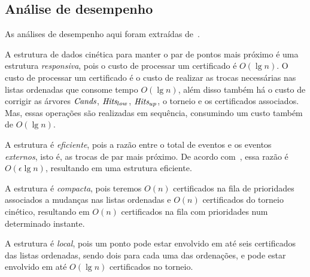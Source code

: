 







\FloatBarrier

\subsection{Análise de desempenho}\label{subsec:par:analise-de-desempenho}

As análises de desempenho aqui foram extraídas de~\cite{eduardo}.

A estrutura de dados cinética para manter o par de pontos mais próximo é uma estrutura
\textit{responsiva}, pois o custo de processar um certificado é $O(\lg{n})$.
O custo de processar um certificado é o custo de realizar as trocas necessárias nas listas
ordenadas que consome tempo $O(\lg{n})$, além disso também há o custo de corrigir as árvores
$\textit{Cands}$, $\textit{Hits}_{low}$, $\textit{Hits}_{up}$, o torneio e os certificados associados.
Mas, essas operações são realizadas em sequência, consumindo um custo também de $O(\lg{n})$.

A estrutura é \textit{eficiente}, pois a razão entre o total de eventos e os eventos
\textit{externos}, isto é, as trocas de par mais próximo.
De acordo com~\cite{eduardo}, essa razão é $O(\epsilon \lg{n})$, resultando em uma estrutura
eficiente.

A estrutura é \textit{compacta}, pois teremos $O(n)$ certificados na fila de prioridades
associados a mudanças nas listas ordenadas e $O(n)$ certificados do torneio cinético, resultando
em $O(n)$ certificados na fila com prioridades num determinado instante.

A estrutura é \textit{local}, pois um ponto pode estar envolvido em até seis certificados das
listas ordenadas, sendo dois para cada uma das ordenações, e pode estar envolvido em até
$O(\lg{n})$ certificados no torneio.
